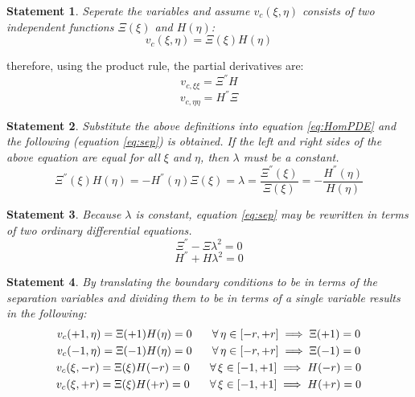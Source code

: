 \documentclass[10pt, reqno]{amsart}
\newtheorem{mydef}{Statement}
\begin{document}
\begin{mydef}
Seperate the variables and assume $v_c\left(\xi, \eta\right)$ consists of two independent functions $\Xi\left(\xi\right)$ and $H \left(\eta\right)$: 
$$v_c \left( \xi,\eta \right) = \Xi \left( \xi \right) H \left( \eta \right)$$ 
\end{mydef}

therefore, using the product rule, the partial derivatives are:
$$v_{c,\xi \xi} = \Xi^{''} H $$
$$v_{c,\eta \eta} = H^{''} \Xi$$

\begin{mydef}
Substitute the above definitions into equation  \ref{eq:HomPDE} and the following (equation \ref{eq:sep}) is obtained. If the left and right sides of the above equation are equal for all $\xi$ and $\eta$, then $\lambda$ must be a constant.
\begin{equation} \label{eq:sep}
	\Xi^{''}(\xi) H(\eta)=-H^{''}(\eta) \Xi(\xi)=\lambda = \frac{\Xi^{''}(\xi)}{\Xi(\xi)}=-\frac{H^{''}(\eta)}{H(\eta)}
\end{equation}
\end{mydef}

\begin{mydef}
Because $\lambda$ is constant, equation \ref{eq:sep} may be rewritten in terms of two ordinary differential equations.  
\begin{equation} \label{eq:ode1}
\Xi^{''} - \Xi \lambda^2 = 0 
\end{equation}
\begin{equation} \label{eq:ode2}
H^{''}+H\lambda^2 = 0
\end{equation}
\end{mydef}

\begin{mydef}
By translating the boundary conditions to be in terms of the separation variables and dividing them to be in terms of a single variable results in the following:
\begin{gather*}
	v_c(+1,\eta) = \Xi(+1)H(\eta) = 0 \hspace{0.25in} \forall \, \eta \in[-r,+r] \implies \Xi(+1)=0 \\
	v_c(-1,\eta) = \Xi(-1)H(\eta) = 0 \hspace{0.25in} \forall \, \eta \in[-r,+r] \implies \Xi(-1)=0 \\
	v_c(\xi,-r) = \Xi(\xi)H(-r) = 0 \hspace{0.25in} \forall \, \xi \in[-1,+1] \implies H(-r)=0 \\
	v_c(\xi,+r) = \Xi(\xi)H(+r) = 0 \hspace{0.25in} \forall \, \xi \in[-1,+1] \implies H(+r)=0
\end{gather*}
\end{mydef}
\end{document}
